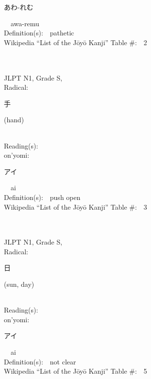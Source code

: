 \begin{multicols}{2}
{\hspace*{2em}}{\begin{CJK}{UTF8}{min} あわ-れむ \end{CJK}}\ \ awa-remu\ \ \\
Definition(s):\ \ pathetic \\
Wikipedia ``List of the J\=oy\=o Kanji'' Table \#:\ \      2 \\
\ \ \\
{\fontsize{34pt}{40pt}  }\ \ \\
{JLPT N1, Grade S, \\Radical:\ \ {\begin{CJK}{UTF8}{min} 手 \end{CJK}} (hand) } \\
Reading(s):\ \ \\
{\hspace*{1em}}on'yomi:\ \ \\
{\hspace*{2em}}{\begin{CJK}{UTF8}{min} アイ \end{CJK}}\ \ ai\ \ \\
Definition(s):\ \ push open \\
Wikipedia ``List of the J\=oy\=o Kanji'' Table \#:\ \      3 \\
\ \ \\
{\fontsize{34pt}{40pt}  }\ \ \\
{JLPT N1, Grade S, \\Radical:\ \ {\begin{CJK}{UTF8}{min} 日 \end{CJK}} (sun, day) } \\
Reading(s):\ \ \\
{\hspace*{1em}}on'yomi:\ \ \\
{\hspace*{2em}}{\begin{CJK}{UTF8}{min} アイ \end{CJK}}\ \ ai\ \ \\
Definition(s):\ \ not clear \\
Wikipedia ``List of the J\=oy\=o Kanji'' Table \#:\ \      5 \\
\ \ \\
{\fontsize{34pt}{40pt}  }\ \ \\

\end{multicols}

